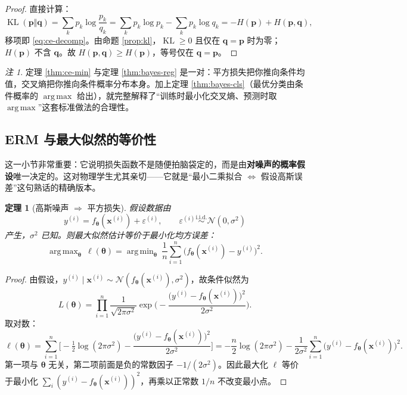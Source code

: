 \documentclass[UTF8,a4paper,11pt]{ctexart}
\theoremstyle{definition}
\theoremstyle{plain}
\newtheorem{theorem}[definition]{定理}
\theoremstyle{remark}
\newtheorem{remark}[definition]{注}
\DeclareMathOperator*{\argmin}{arg\,min}
\DeclareMathOperator*{\argmax}{arg\,max}
\DeclareMathOperator{\KL}{KL}
\begin{document}
\begin{proof}
直接计算：
\[
  \KL(\bm{p}\Vert\bm{q})=\sum_k p_k\log\frac{p_k}{q_k}
  =\sum_k p_k\log p_k-\sum_k p_k\log q_k=-H(\bm{p})+H(\bm{p},\bm{q}),
\]
移项即 \eqref{eq:ce-decomp}。由命题 \ref{prop:kl}，$\KL\ge0$ 且仅在 $\bm{q}=\bm{p}$ 时为零；$H(\bm{p})$ 不含 $\bm{q}$。故 $H(\bm{p},\bm{q})\ge H(\bm{p})$，等号仅在 $\bm{q}=\bm{p}$。
\end{proof}

\begin{remark}
定理 \ref{thm:ce-min} 与定理 \ref{thm:bayes-reg} 是一对：平方损失把你推向条件均值，交叉熵把你推向条件概率分布本身。加上定理 \ref{thm:bayes-cls}（最优分类由条件概率的 $\argmax$ 给出），就完整解释了“训练时最小化交叉熵、预测时取 $\argmax$”这套标准做法的合理性。
\end{remark}

\subsection{ERM 与最大似然的等价性}

这一小节非常重要：它说明损失函数不是随便拍脑袋定的，而是由\textbf{对噪声的概率假设}唯一决定的。这对物理学生尤其亲切——它就是“最小二乘拟合 $\Leftrightarrow$ 假设高斯误差”这句熟话的精确版本。

\begin{theorem}[高斯噪声 $\Longrightarrow$ 平方损失]\label{thm:gauss-mse}
假设数据由
\[
  y^{(i)}=f_{\bm{\theta}}(\bm{x}^{(i)})+\varepsilon^{(i)},\qquad
  \varepsilon^{(i)}\overset{\text{i.i.d.}}{\sim}\mathcal{N}(0,\sigma^2)
\]
产生，$\sigma^2$ 已知。则最大似然估计等价于最小化均方误差：
\[
  \argmax_{\bm{\theta}}\ \ell(\bm{\theta})=\argmin_{\bm{\theta}}\ \frac1n\sum_{i=1}^n\big(f_{\bm{\theta}}(\bm{x}^{(i)})-y^{(i)}\big)^2 .
\]
\end{theorem}

\begin{proof}
由假设，$y^{(i)}\mid\bm{x}^{(i)}\sim\mathcal{N}(f_{\bm{\theta}}(\bm{x}^{(i)}),\sigma^2)$，故条件似然为
\[
  L(\bm{\theta})=\prod_{i=1}^{n}\frac{1}{\sqrt{2\pi\sigma^2}}
  \exp\Big(-\frac{\big(y^{(i)}-f_{\bm{\theta}}(\bm{x}^{(i)})\big)^2}{2\sigma^2}\Big).
\]
取对数：
\[
  \ell(\bm{\theta})=\sum_{i=1}^n\Big[-\tfrac12\log(2\pi\sigma^2)-\frac{\big(y^{(i)}-f_{\bm{\theta}}(\bm{x}^{(i)})\big)^2}{2\sigma^2}\Big]
  =-\frac{n}{2}\log(2\pi\sigma^2)-\frac{1}{2\sigma^2}\sum_{i=1}^n\big(y^{(i)}-f_{\bm{\theta}}(\bm{x}^{(i)})\big)^2 .
\]
第一项与 $\bm{\theta}$ 无关，第二项前面是负的常数因子 $-1/(2\sigma^2)$。因此最大化 $\ell$ 等价于最小化 $\sum_i(y^{(i)}-f_{\bm{\theta}}(\bm{x}^{(i)}))^2$，再乘以正常数 $1/n$ 不改变最小点。
\end{proof}
\end{document}
